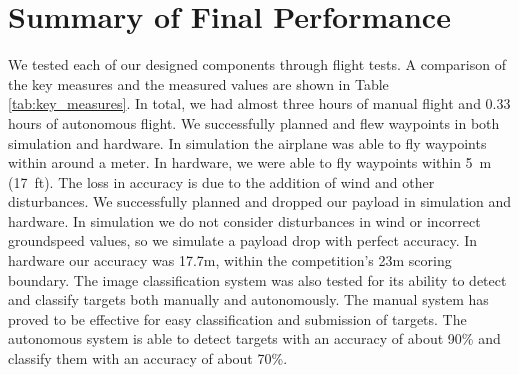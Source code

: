\documentclass[]{auvsi_doc}
\begin{document}
\section{Summary of Final Performance}

We tested each of our designed components through flight tests. A comparison of the key measures and the measured values are shown in Table \ref{tab:key_measures}. In total, we had almost three hours of manual flight and 0.33 hours of autonomous flight. We successfully planned and flew waypoints in both simulation and hardware. In simulation the airplane was able to fly waypoints within around a meter. In hardware, we were able to fly waypoints within 5~m (17~ft). The loss in accuracy is due to the addition of wind and other disturbances. We successfully planned and dropped our payload in simulation and hardware. In simulation we do not consider disturbances in wind or incorrect groundspeed values, so we simulate a payload drop with perfect accuracy. In hardware our accuracy was 17.7m, within the competition's 23m scoring boundary. The image classification system was also tested for its ability to detect and classify targets both manually and autonomously. The manual system has proved to be effective for easy classification and submission of targets. The autonomous system is able to detect targets with an accuracy of about 90\% and classify them with an accuracy of about 70\%.
\end{document}
